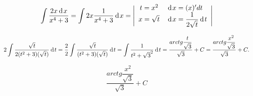 {}

$$
  \int \dfrac{2x\hspace{2pt}\text{d}\hspace{1pt}{x}}{x^4+3}
= \int 2x \dfrac{1}{x^4+3} \hspace{2pt}\text{d}\hspace{1pt}{x}
= \Bigg|
    \begin{array}{c l}
      t = x^2   & \hspace{2pt}\text{d}\hspace{1pt}{x} = (x)'dt \\
      x = \sqrt{t} & \hspace{2pt}\text{d}\hspace{1pt}{x} = \dfrac{1}{2\sqrt{t}}\hspace{2pt}\text{d}\hspace{1pt}{t}
      \end{array}
  \Bigg|
$$

$$
  2 \int \dfrac{\sqrt{t}}{2(t^2+3)(\sqrt{t})}\hspace{2pt}\text{d}\hspace{1pt}{t}
= \dfrac{2}{2} \int \dfrac{\sqrt{t}}{(t^2+3)(\sqrt{t})}\hspace{2pt}\text{d}\hspace{1pt}{t}
= \int \dfrac{1}{t^2+\sqrt{3}^2}\hspace{2pt}\text{d}\hspace{1pt}{t}
= \dfrac{arctg{\dfrac{t}{\sqrt{3}}}}{\sqrt{3}} + C
= \dfrac{arctg{\dfrac{x^2}{\sqrt{3}}}}{\sqrt{3}} + C.
$$


$$
  \boxed{\dfrac{arctg{\dfrac{x^2}{\sqrt{3}}}}{\sqrt{3}} + C}
$$
